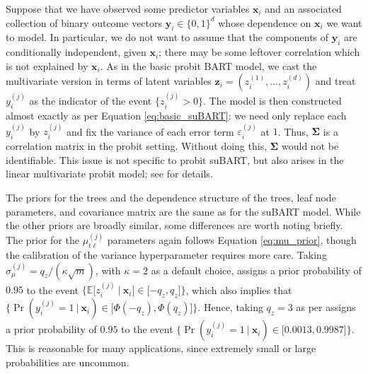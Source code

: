 \documentclass[aoas,preprint]{imsart}
\newcommand\given[1][]{\:#1\vert\:}
\theoremstyle{plain}
\theoremstyle{definition}
\theoremstyle{remark}
\begin{document}
Suppose that we have observed some predictor variables $\mathbf{x}_i$ and an associated collection of binary outcome vectors $\mathbf{y}_i \in \{0,1\}^d$ whose dependence on $\mathbf{x}_i$ we want to model. In particular, we do not want to assume that the components of $\mathbf{y}_i$ are conditionally independent, given $\mathbf{x}_i$; there may be some leftover correlation which is not explained by $\mathbf{x}_i$. As in the basic probit BART model, we cast the multivariate version in terms of latent variables $\mathbf{z}_i = (z_i^{(1)},\ldots,z_i^{(d)})$ and treat $y^{(j)}_i$ as the indicator of the event $\{z^{(j)}_i > 0\}$. The model is then constructed almost exactly as per Equation \eqref{eq:basic_suBART}: we need only replace each $y_i^{(j)}$ by $z_i^{(j)}$ and fix the variance of each error term $\varepsilon_i^{(j)}$ at $1$. 
Thus, $\boldsymbol{\Sigma}$ is a correlation matrix in the probit setting. Without doing this, $\boldsymbol{\Sigma}$ would not be identifiable. This issue is not specific to probit suBART, but also arises in the linear multivariate probit model; see \citet{chib1998analysis} for details. 

The priors for the trees and the dependence structure of the trees, leaf node parameters, and covariance matrix are the same as for the suBART model. 
While the other priors are broadly similar, some differences are worth noting briefly.
The prior for the  $\mu_{t\ell}^{(j)}$ parameters again follows Equation \eqref{eq:mu_prior}, though the calibration of the variance hyperparameter requires more care. Taking ${\sigma^{(j)}_{\mu}} = q_z/(\kappa\sqrt{m})$, with $\kappa = 2$ as a default choice, assigns a prior probability of $0.95$ to the event $\{\mathbb{E}\lbrack z_i^{(j)}\given \mathbf{x}_i\rbrack \in \lbrack -q_z,q_z\rbrack\}$, which also implies that $\{\Pr(y_i^{(j)} = 1 \given \mathbf{x}_i) \in \lbrack\Phi(-q_z), \Phi(q_z)\rbrack\}$. Hence, taking $q_z = 3$ as per \citet{chipman2010bart} assigns a prior probability of $0.95$ to the event $\{\Pr(y_i^{(j)} = 1\given \mathbf{x}_i) \in \lbrack0.0013,0.9987\rbrack\}$. This is reasonable for many applications, since extremely small or large probabilities are uncommon. 
\end{document}
